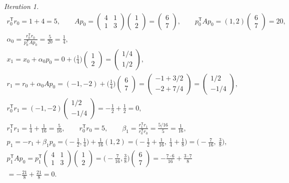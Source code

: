 \documentclass[11pt,a4paper]{article}
\newcommand{\T}{^{\mathsf T}}
\begin{document}
\emph{Iteration 1.}
\begin{gather*}
r_0\T r_0=1+4=5,\qquad
Ap_0=\begin{pmatrix}4&1\\1&3\end{pmatrix}\begin{pmatrix}1\\2\end{pmatrix}=\begin{pmatrix}6\\7\end{pmatrix},\qquad
p_0\T Ap_0=(1,2)\begin{pmatrix}6\\7\end{pmatrix}=20,\\
\alpha_0=\frac{r_0\T r_0}{p_0\T Ap_0}=\frac{5}{20}=\frac14,\\
x_1=x_0+\alpha_0p_0=0+\Big(\frac14\Big)\begin{pmatrix}1\\2\end{pmatrix}=\begin{pmatrix}1/4\\1/2\end{pmatrix},\\
r_1=r_0+\alpha_0Ap_0=(-1,-2)+\Big(\frac14\Big)\begin{pmatrix}6\\7\end{pmatrix}
=\begin{pmatrix}-1+3/2\\-2+7/4\end{pmatrix}=\begin{pmatrix}1/2\\-1/4\end{pmatrix},\\
r_0\T r_1=(-1,-2)\begin{pmatrix}1/2\\-1/4\end{pmatrix}=-\frac12+\frac12=0,\\
r_1\T r_1=\frac14+\frac1{16}=\frac{5}{16},\qquad r_0\T r_0=5,\qquad
\beta_1=\frac{r_1\T r_1}{r_0\T r_0}=\frac{5/16}{5}=\frac1{16},\\
p_1=-r_1+\beta_1p_0=\Big(-\frac12,\frac14\Big)+\frac1{16}(1,2)
=\Big(-\frac12+\frac1{16},\ \frac14+\frac18\Big)=\Big(-\frac7{16},\ \frac38\Big),\\
p_1\T Ap_0=p_1\T\begin{pmatrix}4&1\\1&3\end{pmatrix}\begin{pmatrix}1\\2\end{pmatrix}
=\Big(-\frac7{16},\frac38\Big)\begin{pmatrix}6\\7\end{pmatrix}
=-\frac{7\cdot6}{16}+\frac{3\cdot7}{8}\\
=-\frac{21}{8}+\frac{21}{8}=0 .
\end{gather*}
\end{document}
